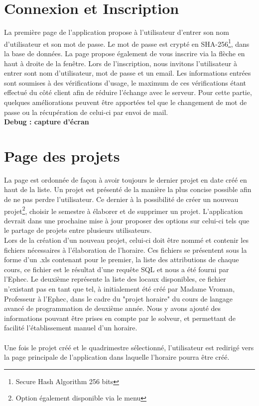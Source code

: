 \section{Connexion et Inscription}

La première page de l'application propose à l'utilisateur d'entrer son nom d'utilisateur et son mot de passe. Le mot de passe est crypté en SHA-256\footnote{Secure Hash Algorithm 256 bits}, dans la base de données. La page propose également de vous inscrire via la flèche en haut à droite de la fenêtre.
\newline
\indent
Lors de l'inscription, nous invitons l'utilisateur à entrer sont nom d'utilisateur, mot de passe et un email. Les informations entrées sont soumises à des vérifications d'usage, le maximum de ces vérifications étant effectué du côté client afin de réduire l'échange avec le serveur.
\newline
\indent
Pour cette partie, quelques améliorations peuvent être apportées tel que le changement de mot de passe ou la récupération de celui-ci par envoi de mail.\\
\newline
\indent
\textbf{Debug : capture d'écran}

\section{Page des projets}

La page est ordonnée de façon à avoir toujours le dernier projet en date créé en haut de la liste. Un projet est présenté de la manière la plus concise possible afin de ne pas perdre l'utilisateur. Ce dernier à la possibilité de créer un nouveau projet\footnote{Option également disponible via le menu}, choisir le semestre à élaborer et de supprimer un projet. L'application devrait dans une prochaine mise à jour proposer des options sur celui-ci tels que le partage de projets entre plusieurs utilisateurs.\\
\newline
\indent
Lors de la création d'un nouveau projet, celui-ci doit être nommé et contenir les fichiers nécessaires à l'élaboration de l'horaire. Ces fichiers se présentent sous la forme d'un .xls contenant pour le premier, la liste des attributions de chaque cours, ce fichier est le résultat d'une requête SQL et nous a été fourni par l'Ephec. Le deuxième représente la liste des locaux disponibles, ce fichier n'existant pas en tant que tel, à initialement été créé par Madame Vroman, Professeur à l'Ephec, dans le cadre du "projet horaire" du cours de langage avancé de programmation de deuxième année. Nous y avons ajouté des informations pouvant être prises en compte par le solveur, et permettant de facilité l'établissement manuel d'un horaire.\\
\\
Une fois le projet créé et le quadrimestre sélectionné, l'utilisateur est redirigé vers la page principale de l'application dans laquelle l'horaire pourra être créé.

